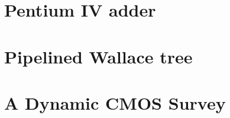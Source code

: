 \documentclass[a4paper, 10 pt]{report}
\begin{document}

\tableofcontents
\chapter{Pentium IV adder}

\chapter{Pipelined Wallace tree}






\chapter{A Dynamic CMOS Survey}

	

\end{document}

